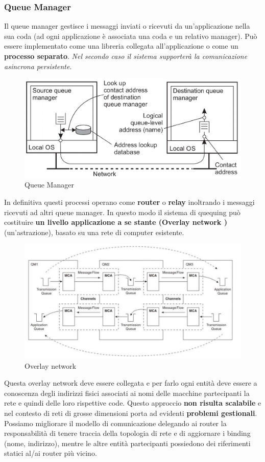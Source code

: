 \documentclass[12pt]{article}
\begin{document}
		\subsubsection{Queue Manager}
			Il queue manager gestisce i messaggi inviati o ricevuti da un'applicazione nella sua coda (ad ogni applicazione è associata una coda e un relativo manager). Può essere implementato come una libreria collegata all'applicazione o come un \textbf{processo separato}. \textit{Nel secondo caso il sistema supporterà la comunicazione asincrona persistente}.
			\begin{figure}[h!]
				\centering
				\includegraphics[scale=0.30]{img/mana.png}
				\caption{Queue Manager }
			\end{figure}
			In definitiva questi processi operano come \textbf{router} o \textbf{relay} inoltrando i messaggi ricevuti ad altri queue manager. In questo modo il sistema di quequing può costituire \textbf{un livello applicazione a se stante (Overlay network )} (un'astrazione), basato su una rete di computer esistente.
			\begin{figure}[h!]
				\centering
				\includegraphics[scale=0.40]{img/overlay.png}
				\caption{Overlay network }
			\end{figure}
			Questa overlay network deve essere collegata e per farlo ogni entità deve essere a conoscenza degli indirizzi fisici associati ai nomi delle macchine partecipanti la rete e quindi delle loro rispettive code. Questo approccio \textbf{non risulta scalabile} e nel contesto di reti di grosse dimensioni porta ad evidenti \textbf{problemi gestionali}. Possiamo migliorare il modello di comunicazione delegando ai router la responsabilità di tenere traccia della topologia di rete e di aggiornare i binding (nome, indirizzo), mentre le altre entità partecipanti possiedono dei riferimenti statici al/ai router più vicino.
			
\end{document}
